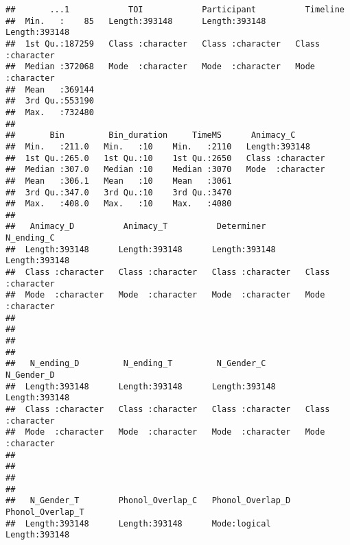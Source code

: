 \documentclass[
]{article}
\begin{document}
\begin{verbatim}
##       ...1            TOI            Participant          Timeline        
##  Min.   :    85   Length:393148      Length:393148      Length:393148     
##  1st Qu.:187259   Class :character   Class :character   Class :character  
##  Median :372068   Mode  :character   Mode  :character   Mode  :character  
##  Mean   :369144                                                           
##  3rd Qu.:553190                                                           
##  Max.   :732480                                                           
##                                                                           
##       Bin         Bin_duration     TimeMS      Animacy_C        
##  Min.   :211.0   Min.   :10    Min.   :2110   Length:393148     
##  1st Qu.:265.0   1st Qu.:10    1st Qu.:2650   Class :character  
##  Median :307.0   Median :10    Median :3070   Mode  :character  
##  Mean   :306.1   Mean   :10    Mean   :3061                     
##  3rd Qu.:347.0   3rd Qu.:10    3rd Qu.:3470                     
##  Max.   :408.0   Max.   :10    Max.   :4080                     
##                                                                 
##   Animacy_D          Animacy_T          Determiner         N_ending_C       
##  Length:393148      Length:393148      Length:393148      Length:393148     
##  Class :character   Class :character   Class :character   Class :character  
##  Mode  :character   Mode  :character   Mode  :character   Mode  :character  
##                                                                             
##                                                                             
##                                                                             
##                                                                             
##   N_ending_D         N_ending_T         N_Gender_C         N_Gender_D       
##  Length:393148      Length:393148      Length:393148      Length:393148     
##  Class :character   Class :character   Class :character   Class :character  
##  Mode  :character   Mode  :character   Mode  :character   Mode  :character  
##                                                                             
##                                                                             
##                                                                             
##                                                                             
##   N_Gender_T        Phonol_Overlap_C   Phonol_Overlap_D Phonol_Overlap_T  
##  Length:393148      Length:393148      Mode:logical     Length:393148     

\end{verbatim}
\end{document}
